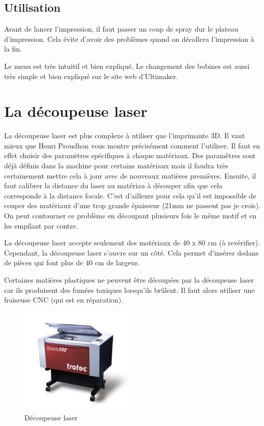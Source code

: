 \documentclass[a4paper, 11pt]{report}
\begin{document}
\subsection{Utilisation}
Avant de lancer l'impression, il faut passer un coup de spray dur le plateau d'impression. Cela évite d'avoir des problèmes quand on décollera l'impression à la fin.

Le menu est très intuitif et bien expliqué. Le changement des bobines est aussi très simple et bien expliqué sur le site web d'Ultimaker.

\section{La découpeuse laser}
La découpeuse laser est plus complexe à utiliser que l'imprimante 3D. Il vaut mieux que Henri Proudhon vous montre précisément comment l'utiliser. Il faut en effet choisir des paramètres spécifiques à chaque matériaux. Des paramètres sont déjà définis dans la machine pour certains matériaux mais il faudra très certainement mettre cela à jour avec de nouveaux matières premières. Ensuite, il faut calibrer la distance du laser au matériau à découper afin que cela corresponde à la distance focale. C'est d'ailleurs pour cela qu'il est impossible de couper des matériaux d'une trop grande épaisseur (21mm ne passent pas je crois). On peut contourner ce problème en découpant plusieurs fois le même motif et en les empilant par contre.

La découpeuse laser accepte seulement des matériaux de 40 x 80 cm (à revérifier). Cependant, la découpeuse laser s'ouvre sur un côté. Cela permet d'insérer dedans de pièces qui font plus de 40 cm de largeur.

Certaines matières plastiques ne peuvent être découpées par la découpeuse laser car ils produisent des fumées toxiques lorsqu'ils brûlent. Il faut alors utiliser une fraiseuse CNC (qui est en réparation).

\begin{figure}[h]
	\begin{center}
		\includegraphics[width=0.5\textwidth]{images/decoupeuse_laser.jpg}
		\caption{Découpeuse laser}
	\end{center}
\end{figure}
\end{document}

